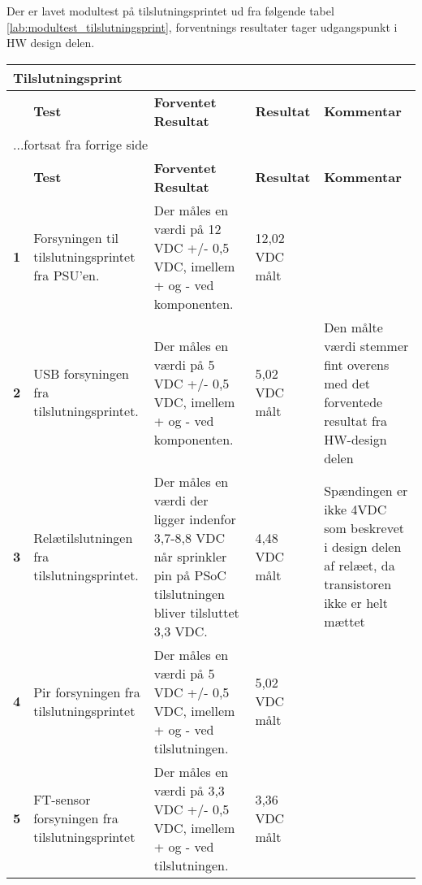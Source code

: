 Der er lavet modultest på tilslutningsprintet ud fra følgende tabel \ref{lab:modultest_tilslutningsprint}, forventnings resultater tager udgangspunkt i HW design delen.

\begin{center}
\begin{longtable}{|p{}|p{}|p{}|p{}|p{}|} %
\hline
\multicolumn{5}{|l|}{\textbf{Tilslutningsprint}} \\ \hline
\multicolumn{1}{|c|}{} &
\textbf{Test} &
\textbf{Forventet \newline Resultat} &
\textbf{Resultat} &
\textbf{Kommentar} \\ \hline 
\endfirsthead

\multicolumn{5}{l}{...fortsat fra forrige side} \\ \hline 
\multicolumn{1}{|c|}{} &
\textbf{Test} &
\textbf{Forventet \newline Resultat} &
\textbf{Resultat} &
\textbf{Kommentar} \\ \hline 
\endhead

\textbf{1}	&Forsyningen til tilslutningsprintet fra PSU'en.
			&Der måles en værdi på 12 VDC +/- 0,5 VDC, imellem + og - ved komponenten.
			& 12,02 VDC målt
			&  \\ \hline 
			
\textbf{2}	&USB forsyningen fra tilslutningsprintet.
			&Der måles en værdi på 5 VDC +/- 0,5 VDC,  imellem + og - ved komponenten.
			& 5,02 VDC målt
			& Den målte værdi stemmer fint overens med det forventede resultat fra HW-design delen \\ \hline 
			
\textbf{3}	&Relætilslutningen fra tilslutningsprintet.
			&Der måles en værdi der ligger indenfor 3,7-8,8 VDC når sprinkler pin på PSoC tilslutningen bliver tilsluttet 3,3 VDC. 
			&4,48 VDC målt
			&Spændingen er ikke 4VDC som beskrevet i design delen af relæet, da transistoren ikke er helt mættet\\ \hline 
			
\textbf{4}	&Pir forsyningen fra tilslutningsprintet
			&Der måles en værdi på 5 VDC +/- 0,5 VDC, imellem + og - ved tilslutningen.
			&5,02 VDC målt
			& \\ \hline 
			
\textbf{5}	&FT-sensor forsyningen fra tilslutningsprintet
			&Der måles en værdi på 3,3 VDC +/- 0,5 VDC, imellem + og - ved tilslutningen.
			& 3,36 VDC målt
			& \\ \hline 						
			

\end{longtable}
\end{center}
